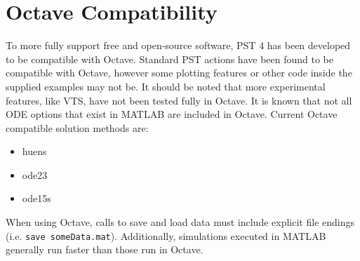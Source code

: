 \section{Octave Compatibility}
To more fully support free and open-source software, PST 4 has been developed to be compatible with Octave.
Standard PST actions have been found to be compatible with Octave, however some plotting features or other code inside the supplied examples may not be.
It should be noted that more experimental features, like VTS, have not been tested fully in Octave.
It is known that not all ODE options that exist in MATLAB are included in Octave.
Current Octave compatible solution methods are:
\begin{itemize}
 em
\singlespacing
\item huens
\item ode23
\item ode15s
\end{itemize}
When using Octave, calls to save and load data must include explicit file endings (i.e. \verb|save someData.mat|).
Additionally, simulations executed in MATLAB generally run faster than those run in Octave.
